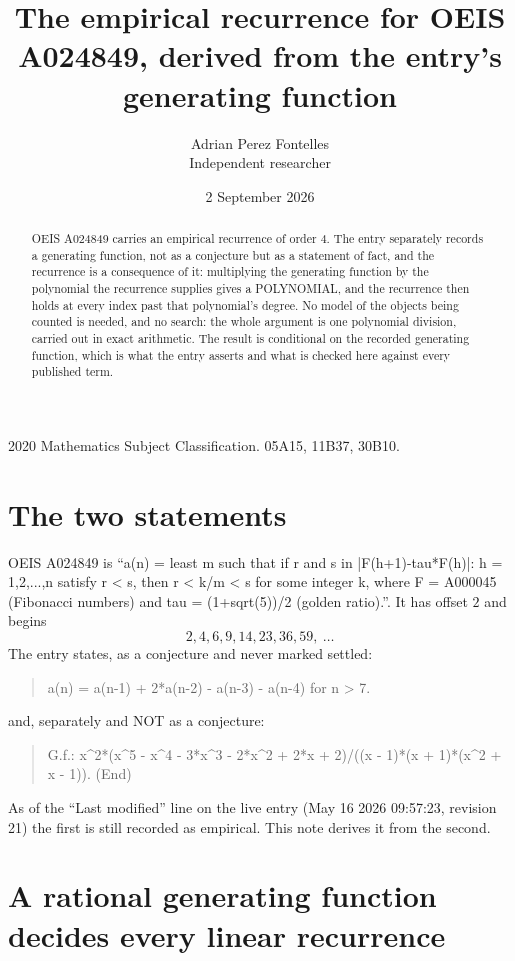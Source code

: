 \documentclass[11pt,a4paper]{article}
\title{The empirical recurrence for OEIS A024849, derived from the entry's generating function}
\author{Adrian Perez Fontelles\\ \small Independent researcher}
\date{2 September 2026}
\theoremstyle{plain}
\theoremstyle{definition}
\begin{document}
\maketitle

\begin{abstract}
OEIS A024849 carries an empirical recurrence of order $4$. The entry separately records a
generating function, not as a conjecture but as a statement of fact, and the recurrence is a
consequence of it: multiplying the generating function by the polynomial the recurrence
supplies gives a POLYNOMIAL, and the recurrence then holds at every index past that
polynomial's degree. No model of the objects being counted is needed, and no search: the
whole argument is one polynomial division, carried out in exact arithmetic. The result is
conditional on the recorded generating function, which is what the entry asserts and what is
checked here against every published term.
\end{abstract}

\noindent\small 2020 Mathematics Subject Classification. 05A15, 11B37, 30B10.\normalsize

\section{The two statements}

OEIS A024849 is ``a(n) = least m such that if r and s in {|F(h+1)-tau*F(h)|: h = 1,2,...,n} satisfy r < s, then r < k/m < s for some integer k, where F = A000045 (Fibonacci numbers) and tau = (1+sqrt(5))/2 (golden ratio).''. It has offset $2$ and begins
\[
2, 4, 6, 9, 14, 23, 36, 59,\ \dots
\]
The entry states, as a conjecture and never marked settled:
\begin{quote}
a(n) = a(n-1) + 2*a(n-2) - a(n-3) - a(n-4) for n > 7.
\end{quote}
and, separately and NOT as a conjecture:
\begin{quote}
G.f.: x\^{}2*(x\^{}5 - x\^{}4 - 3*x\^{}3 - 2*x\^{}2 + 2*x + 2)/((x - 1)*(x + 1)*(x\^{}2 + x - 1)). (End)
\end{quote}
As of the ``Last modified'' line on the live entry (May 16 2026 09:57:23, revision 21) the first is still
recorded as empirical. This note derives it from the second.

\section{A rational generating function decides every linear recurrence}
\end{document}
